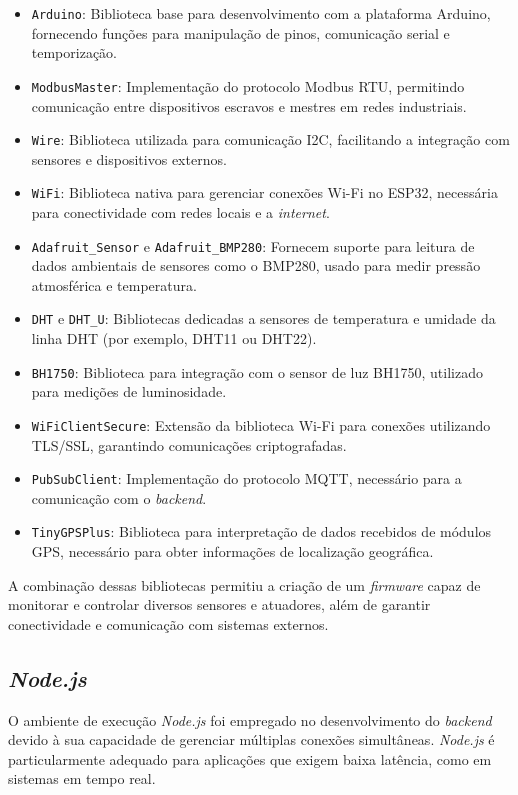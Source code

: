 \begin{itemize}
    \item \texttt{Arduino}: Biblioteca base para desenvolvimento com a plataforma Arduino, fornecendo funções para manipulação de pinos, comunicação serial e temporização.
    \item \texttt{ModbusMaster}: Implementação do protocolo Modbus RTU, permitindo comunicação entre dispositivos escravos e mestres em redes industriais.
    \item \texttt{Wire}: Biblioteca utilizada para comunicação I2C, facilitando a integração com sensores e dispositivos externos.
    \item \texttt{WiFi}: Biblioteca nativa para gerenciar conexões Wi-Fi no ESP32, necessária para conectividade com redes locais e a \textit{internet}.
    \item \texttt{Adafruit\_Sensor} e \texttt{Adafruit\_BMP280}: Fornecem suporte para leitura de dados ambientais de sensores como o BMP280, usado para medir pressão atmosférica e temperatura.
    \item \texttt{DHT} e \texttt{DHT\_U}: Bibliotecas dedicadas a sensores de temperatura e umidade da linha DHT (por exemplo, DHT11 ou DHT22).
    \item \texttt{BH1750}: Biblioteca para integração com o sensor de luz BH1750, utilizado para medições de luminosidade.
    \item \texttt{WiFiClientSecure}: Extensão da biblioteca Wi-Fi para conexões utilizando TLS/SSL, garantindo comunicações criptografadas.
    \item \texttt{PubSubClient}: Implementação do protocolo MQTT, necessário para a comunicação com o \textit{backend}.
    \item \texttt{TinyGPSPlus}: Biblioteca para interpretação de dados recebidos de módulos GPS, necessário para obter informações de localização geográfica.
\end{itemize}

A combinação dessas bibliotecas permitiu a criação de um \textit{firmware} capaz de monitorar e controlar diversos sensores e atuadores, além de garantir conectividade e comunicação com sistemas externos.

\subsection{\textit{Node.js}}
O ambiente de execução \textit{Node.js} foi empregado no desenvolvimento do \textit{backend} devido à sua capacidade de gerenciar múltiplas conexões simultâneas. \textit{Node.js} é particularmente adequado para aplicações que exigem baixa latência, como em sistemas em tempo real.

